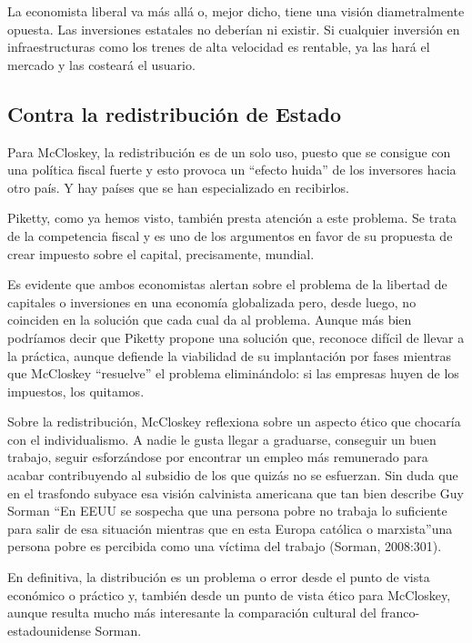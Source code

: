 \documentclass[
]{article}
\begin{document}
La economista liberal va más allá o, mejor dicho, tiene una visión
diametralmente opuesta. Las inversiones estatales no deberían ni
existir. Si cualquier inversión en infraestructuras como los trenes de
alta velocidad es rentable, ya las hará el mercado y las costeará el
usuario.

\hypertarget{contra-la-redistribuciuxf3n-de-estado}{%
\subsection{Contra la redistribución de
Estado}\label{contra-la-redistribuciuxf3n-de-estado}}

Para McCloskey, la redistribución es de un solo uso, puesto que se
consigue con una política fiscal fuerte y esto provoca un ``efecto
huida'' de los inversores hacia otro país. Y hay países que se han
especializado en recibirlos.

Piketty, como ya hemos visto, también presta atención a este problema.
Se trata de la competencia fiscal y es uno de los argumentos en favor de
su propuesta de crear impuesto sobre el capital, precisamente, mundial.

Es evidente que ambos economistas alertan sobre el problema de la
libertad de capitales o inversiones en una economía globalizada pero,
desde luego, no coinciden en la solución que cada cual da al problema.
Aunque más bien podríamos decir que Piketty propone una solución que,
reconoce difícil de llevar a la práctica, aunque defiende la viabilidad
de su implantación por fases mientras que McCloskey ``resuelve'' el
problema eliminándolo: si las empresas huyen de los impuestos, los
quitamos.

Sobre la redistribución, McCloskey reflexiona sobre un aspecto ético que
chocaría con el individualismo. A nadie le gusta llegar a graduarse,
conseguir un buen trabajo, seguir esforzándose por encontrar un empleo
más remunerado para acabar contribuyendo al subsidio de los que quizás
no se esfuerzan. Sin duda que en el trasfondo subyace esa visión
calvinista americana que tan bien describe Guy Sorman ``En EEUU se
sospecha que una persona pobre no trabaja lo suficiente para salir de
esa situación mientras que en esta Europa católica o marxista''una
persona pobre es percibida como una víctima del trabajo (Sorman,
2008:301).

En definitiva, la distribución es un problema o error desde el punto de
vista económico o práctico y, también desde un punto de vista ético para
McCloskey, aunque resulta mucho más interesante la comparación cultural
del franco-estadounidense Sorman.
\end{document}
